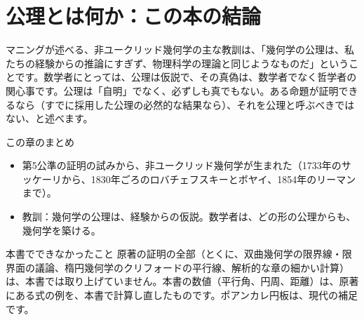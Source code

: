 \documentclass[a4paper,11pt,openany]{ltjsbook}
\begin{document}
\section{公理とは何か：この本の結論}

マニングが述べる、非ユークリッド幾何学の主な教訓は、「幾何学の公理は、私たちの経験からの推論にすぎず、物理科学の理論と同じようなものだ」ということです。数学者にとっては、公理は仮説で、その真偽は、数学者でなく哲学者の関心事です。公理は「自明」でなく、必ずしも真でもない。ある命題が証明できるなら（すでに採用した公理の必然的な結果なら）、それを公理と呼ぶべきではない、と述べます。

\begin{pointbox}{この章のまとめ}
\begin{itemize}[leftmargin=*]
\item 第5公準の証明の試みから、非ユークリッド幾何学が生まれた（1733年のサッケーリから、1830年ごろのロバチェフスキーとボヤイ、1854年のリーマンまで）。
\item 教訓：幾何学の公理は、経験からの仮説。数学者は、どの形の公理からも、幾何学を築ける。
\end{itemize}
\end{pointbox}

\begin{notebox}{本書でできなかったこと}
原著の証明の全部（とくに、双曲幾何学の限界線・限界面の議論、楕円幾何学のクリフォードの平行線、解析的な章の細かい計算）は、本書では取り上げていません。本書の数値（平行角、円周、距離）は、原著にある式の例を、本書で計算し直したものです。ポアンカレ円板は、現代の補足です。
\end{notebox}
\end{document}
